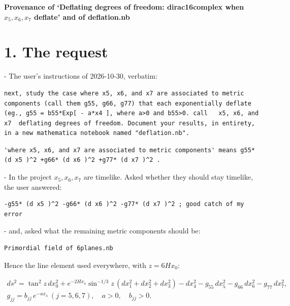 \documentclass[10pt]{article}
\makeatletter
\newcommand\keepnext{\par\nopagebreak\@nobreaktrue\everypar{\@nobreakfalse\everypar{}}}
\newcommand\mdneed[1]{\par\if@nobreak\else\begingroup\setlength{\dimen@}{#1}\dimen@ii\pagegoal\advance\dimen@ii-\pagetotal
  \ifdim\dimen@>\dimen@ii\ifdim\dimen@ii>\z@\vfil\fi\break\fi\endgroup\fi}
\makeatother
\begin{document}
{\raggedright\LARGE\bfseries Provenance of `Deflating degrees of freedom: dirac16complex when $x_5, x_6, x_7$ deflate' and of deflation.nb\par}\medskip

\section*{1. The request}

\mdneed{2.8\baselineskip}The user's instructions of 2026-10-30, verbatim:\keepnext


\begin{lstlisting}
next, study the case where x5, x6, and x7 are associated to metric components (call them g55, g66, g77) that each exponentially deflate (eg., g55 = b55*Exp[ - a*x4 ], where a>0 and b55>0. call   x5, x6, and x7  deflating degrees of freedom. Document your results, in entirety, in a new mathematica notebook named "deflation.nb".
\end{lstlisting}

\begin{lstlisting}
'where x5, x6, and x7 are associated to metric components' means g55* (d x5 )^2 +g66* (d x6 )^2 +g77* (d x7 )^2 .
\end{lstlisting}

\mdneed{2.8\baselineskip}In the project $x_5, x_6, x_7$ are timelike. Asked whether they should stay timelike, the user answered:\keepnext


\begin{lstlisting}
-g55* (d x5 )^2 -g66* (d x6 )^2 -g77* (d x7 )^2 ; good catch of my error
\end{lstlisting}

\mdneed{2.8\baselineskip}and, asked what the remaining metric components should be:\keepnext


\begin{lstlisting}
Primordial field of 6planes.nb
\end{lstlisting}

Hence the line element used everywhere, with $z = 6Hx_0$:\keepnext


\[
\begin{gathered}
ds^2 = \tan^2 z\,dx_0^2 + e^{-2Hx_4}\sin^{-1/3}z\,\left(dx_1^2 + dx_2^2 + dx_3^2\right) - dx_4^2 - g_{55}\,dx_5^2 - g_{66}\,dx_6^2 - g_{77}\,dx_7^2, \\
g_{jj} = b_{jj}\,e^{-ax_4}\ (j = 5, 6, 7),\quad a > 0,\quad b_{jj} > 0 .
\end{gathered}
\]
\end{document}
